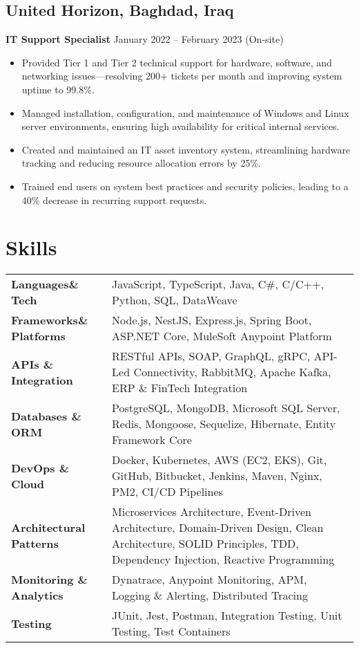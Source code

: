 \documentclass[11pt]{article}
\begin{document}
\subsection*{United Horizon, Baghdad, Iraq}
\textbf{IT Support Specialist} \hfill January 2022 -- February 2023 (On-site)\\
\begin{itemize}[leftmargin=*]\itemsep0pt
  \item Provided Tier 1 and Tier 2 technical support for hardware, software, and networking issues—resolving 200+ tickets per month and improving system uptime to 99.8\%.
  \item Managed installation, configuration, and maintenance of Windows and Linux server environments, ensuring high availability for critical internal services.
  \item Created and maintained an IT asset inventory system, streamlining hardware tracking and reducing resource allocation errors by 25\%.
  \item Trained end users on system best practices and security policies, leading to a 40\% decrease in recurring support requests.
\end{itemize}

\vspace{0.2cm}
\section*{Skills}
{\small
\begin{tabular}{p{3cm} p{11cm}}
{\textbf{Languages\& Tech}} & JavaScript, TypeScript, Java, C\#, C/C++, Python, SQL, DataWeave\\
{\textbf{Frameworks\& Platforms}} & Node.js, NestJS, Express.js, Spring Boot, ASP.NET Core, MuleSoft Anypoint Platform\\
{\textbf{APIs \& Integration}} & RESTful APIs, SOAP, GraphQL, gRPC, API-Led Connectivity, RabbitMQ, Apache Kafka, ERP \& FinTech Integration\\
{\textbf{Databases \& ORM}} & PostgreSQL, MongoDB, Microsoft SQL Server, Redis, Mongoose, Sequelize, Hibernate, Entity Framework Core\\
{\textbf{DevOps \& Cloud}} & Docker, Kubernetes, AWS (EC2, EKS), Git, GitHub, Bitbucket, Jenkins, Maven, Nginx, PM2, CI/CD Pipelines\\
{\textbf{Architectural Patterns}} & Microservices Architecture, Event-Driven Architecture, Domain-Driven Design, Clean Architecture, SOLID Principles, TDD, Dependency Injection, Reactive Programming\\
{\textbf{Monitoring \& Analytics}} & Dynatrace, Anypoint Monitoring, APM, Logging \& Alerting, Distributed Tracing\\
{\textbf{Testing}} & JUnit, Jest, Postman, Integration Testing, Unit Testing, Test Containers
\end{tabular}
}
\end{document}
